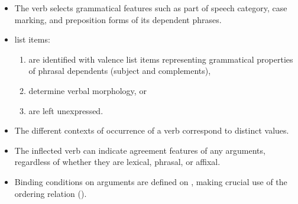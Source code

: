 \documentclass[output=paper
 	        ,biblatex
                ,babelshorthands
                ,newtxmath
                ,draftmode
                ,colorlinks, citecolor=brown
]{langscibook}
\begin{document}
\begin{itemize}
\item The verb selects grammatical features such as part of speech
category, case marking, and preposition forms of its dependent
phrases.
\item \argst list items:
\begin{enumerate}
\item are identified with valence list items
representing grammatical properties of phrasal dependents (subject and
complements),
\item determine verbal morphology, or
\item are left unexpressed.
\end{enumerate}
\item The different contexts of occurrence of a verb correspond to distinct \argst values.
\item The inflected verb can indicate agreement features of any arguments,
regardless of whether they are lexical, phrasal, or affixal.
\item Binding conditions on arguments are defined on \argst, making
crucial use of the ordering relation ().
\end{itemize}
\end{document}
